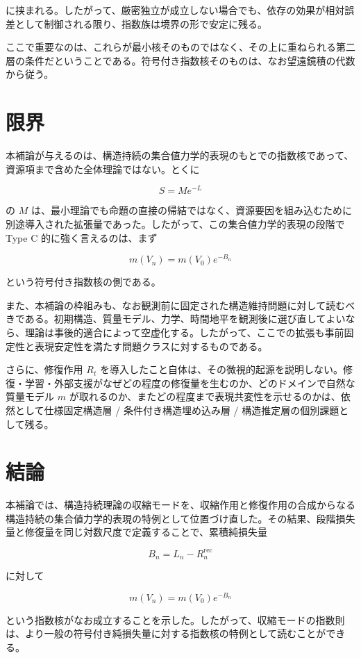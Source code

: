 \documentclass[12pt,a4paper]{article}
\begin{document}
に挟まれる。したがって、厳密独立が成立しない場合でも、依存の効果が相対誤差として制御される限り、指数族は境界の形で安定に残る。

ここで重要なのは、これらが最小核そのものではなく、その上に重ねられる第二層の条件だということである。符号付き指数核そのものは、なお望遠鏡積の代数から従う。

\section{限界}\label{ux9650ux754c}

本補論が与えるのは、構造持続の集合値力学的表現のもとでの指数核であって、資源項まで含めた全体理論ではない。とくに

\[
S = M e^{-L}
\]

の \(M\) は、最小理論でも命題の直接の帰結ではなく、資源要因を組み込むために別途導入された拡張量であった。したがって、この集合値力学的表現の段階で Type C 的に強く言えるのは、まず

\[
m(V_{n}) = m(V_0) e^{-B_{n}}
\]

という符号付き指数核の側である。

また、本補論の枠組みも、なお観測前に固定された構造維持問題に対して読むべきである。初期構造、質量モデル、力学、時間地平を観測後に選び直してよいなら、理論は事後的適合によって空虚化する。したがって、ここでの拡張も事前固定性と表現安定性を満たす問題クラスに対するものである。

さらに、修復作用 \(R_{t}\) を導入したこと自体は、その微視的起源を説明しない。修復・学習・外部支援がなぜどの程度の修復量を生むのか、どのドメインで自然な質量モデル \(m\) が取れるのか、またどの程度まで表現共変性を示せるのかは、依然として仕様固定構造層 / 条件付き構造埋め込み層 / 構造推定層の個別課題として残る。

\section{結論}\label{ux7d50ux8ad6}

本補論では、構造持続理論の収縮モードを、収縮作用と修復作用の合成からなる構造持続の集合値力学的表現の特例として位置づけ直した。その結果、段階損失量と修復量を同じ対数尺度で定義することで、累積純損失量

\[
B_{n} = L_{n} - R_{n}^{\mathrm{rec}}
\]

に対して

\[
m(V_{n}) = m(V_0) e^{-B_{n}}
\]

という指数核がなお成立することを示した。したがって、収縮モードの指数則は、より一般の符号付き純損失量に対する指数核の特例として読むことができる。
\end{document}
